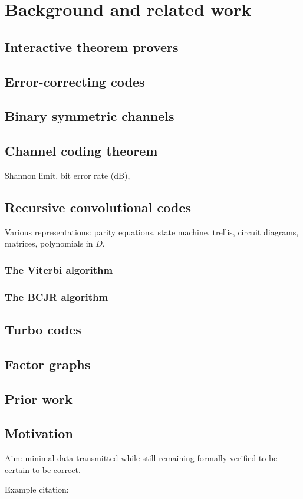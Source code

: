 \chapter{Background and related work}
\label{cha:background}

\section{Interactive theorem provers}

\section{Error-correcting codes}

\section{Binary symmetric channels}

\section{Channel coding theorem}

Shannon limit, bit error rate (dB), 

\section{Recursive convolutional codes}

Various representations: parity equations, state machine, trellis, circuit diagrams, matrices, polynomials in $D$.

\subsection {The Viterbi algorithm}

\subsection{The BCJR algorithm}

\section{Turbo codes}

\section{Factor graphs}

\section{Prior work}

\section{Motivation}

Aim: minimal data transmitted while still remaining formally verified to be certain to be correct.

Example citation: \citep{LH:83,Moon:84,Ungar:84}




